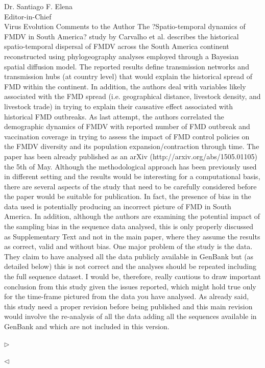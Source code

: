 \documentclass[ucla,biomath,12pt,noaddrfooter,datefrom]{UC_letter}
\newenvironment{reply}{$\triangleright$\bf}{$\triangleleft$}
\begin{document}
\begin{letter}{
Dr. Santiago F. Elena \\
Editor-in-Chief \\
Virus Evolution
}
Comments to the Author
The ?Spatio-temporal dynamics of FMDV in South America? study by Carvalho et al. describes the historical spatio-temporal dispersal of FMDV across the South America continent reconstructed using phylogeography analyses employed through a Bayesian spatial diffusion model. 
The reported results define transmission networks and transmission hubs (at country level) that would explain the historical spread of FMD within the continent. 
In addition, the authors deal with variables likely associated with the FMD spread (i.e. geographical distance, livestock density, and livestock trade) in trying to explain their causative effect associated with historical FMD outbreaks. 
As last attempt, the authors correlated the demographic dynamics of FMDV with reported number of FMD outbreak and vaccination coverage in trying to assess the impact of FMD control policies on the FMDV diversity and its population expansion/contraction through time. 
The paper has been already published as an arXiv (http://arxiv.org/abs/1505.01105) the 5th of May. 
Although the methodological approach has been previously used in different setting and the results would be interesting for a computational basis, there are several aspects of the study that need to be carefully considered before the paper would be suitable for publication. 
In fact, the presence of bias in the data used is potentially producing an incorrect picture of FMD in South America. 
In addition, although the authors are examining the potential impact of the sampling bias in the sequence data analysed, this is only properly discussed as Supplementary Text and not in the main paper, where they assume the results as correct, valid and without bias. 
One major problem of the study is the data. 
They claim to have analysed all the data publicly available in GenBank but (as detailed below) this is not correct and the analyses should be repeated including the full sequence dataset. 
I would be, therefore, really cautious to draw important conclusion from this study given the issues reported, which might hold true only for the time-frame pictured from the data you have analysed. 
As already said, this study need a proper revision before being published and this main revision would involve the re-analysis of all the data adding all the sequences available in GenBank and which are not included in this version.

\begin{reply}

\end{reply}


\end{letter}
\end{document}
